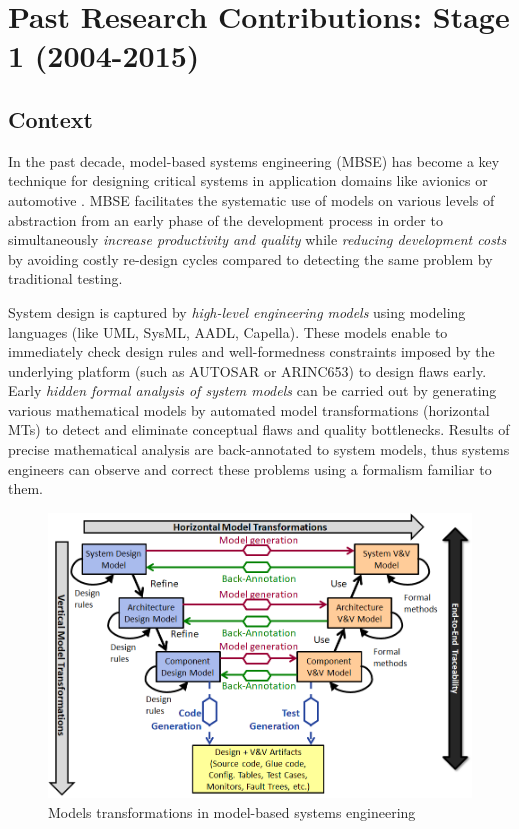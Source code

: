 
\section{Past Research Contributions: Stage 1 (2004-2015)}

\subsection{Context}

In the past decade, model-based systems engineering (MBSE) has become a key technique for designing critical systems in application domains like avionics or automotive \cite{Broy2012,Whittle2014}. MBSE facilitates the systematic use of models on various levels of abstraction from an early phase of the development process in order to simultaneously \emph{increase productivity and quality} while \emph{reducing development costs} by avoiding costly re-design cycles compared to detecting the same problem by traditional testing. 

System design is captured by \emph{high-level engineering models} using modeling languages (like UML, SysML, AADL, Capella). These models enable to immediately check design rules and well-formedness constraints imposed by the underlying platform (such as AUTOSAR or ARINC653) to design flaws early. Early \emph{hidden formal analysis of system models} can be carried out by generating various mathematical models by automated model transformations (horizontal MTs) to detect and eliminate conceptual flaws and quality bottlenecks. Results of precise mathematical analysis are back-annotated to system models, thus systems engineers can observe and correct these problems using a formalism familiar to them. 

\begin{figure}[htb]
\centering
\includegraphics[width=.7\textwidth]{figures/mbse}
\caption{Models transformations in model-based systems engineering}
\label{fig:mbse}
\end{figure}


